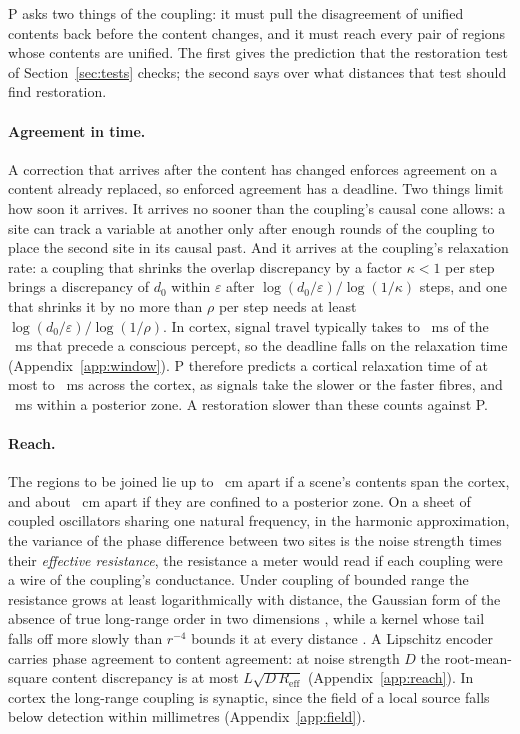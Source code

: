 \documentclass[12pt]{article}
\begin{document}
P asks two things of the coupling: it must pull the disagreement of unified
contents back before the content changes, and it must reach every pair of
regions whose contents are unified. The first gives the prediction that the
restoration test of Section~\ref{sec:tests} checks; the second says over what
distances that test should find restoration.

\paragraph{Agreement in time.} A correction that arrives after the content has
changed enforces agreement on a content already replaced, so enforced agreement
has a deadline. Two things limit how soon it arrives. It arrives no sooner than
the coupling's causal cone allows: a site can track a variable at another only
after enough rounds of the coupling to place the second site in its causal past.
And it arrives at the coupling's relaxation rate: a coupling that shrinks the
overlap discrepancy by a factor $\kappa<1$ per step brings a discrepancy of
$d_0$ within $\varepsilon$ after $\log(d_0/\varepsilon)/\log(1/\kappa)$ steps,
and one that shrinks it by no more than $\rho$ per step needs at least
$\log(d_0/\varepsilon)/\log(1/\rho)$. In cortex, signal travel typically takes
\ueConeFastMs{} to \ueConeSlowMs{}~ms of the \ueContentMs{}~ms that precede a
conscious percept, so the deadline falls on the relaxation time
(Appendix~\ref{app:window}). P therefore predicts a cortical relaxation time of
at most \ueTauSlowMs{} to \ueTauFastMs{}~ms across the cortex, as signals take
the slower or the faster fibres, and \ueTauLocalMs{}~ms within a posterior zone.
A restoration slower than these counts against P.

\paragraph{Reach.} The regions to be joined lie up to \ueFibreCm{}~cm apart if a
scene's contents span the cortex, and about \ueLocalCm{}~cm apart if they are
confined to a posterior zone. On a sheet of coupled oscillators sharing one
natural frequency, in the harmonic approximation, the variance of the phase
difference between two sites is the noise strength times their \emph{effective
resistance}, the resistance a meter would read if each coupling were a wire of
the coupling's conductance. Under coupling of bounded range the resistance grows
at least logarithmically with distance, the Gaussian form of the absence of true
long-range order in two dimensions \citep{mermin1966}, while a kernel whose tail
falls off more slowly than $r^{-4}$ bounds it at every distance
\citep{chung1951,kunz1976}. A Lipschitz encoder carries phase agreement to
content agreement: at noise strength $D$ the root-mean-square content
discrepancy is at most $L\sqrt{D\,R_{\mathrm{eff}}}$ (Appendix~\ref{app:reach}).
In cortex the long-range coupling is synaptic, since the field of a local source
falls below detection within millimetres (Appendix~\ref{app:field}).
\end{document}
